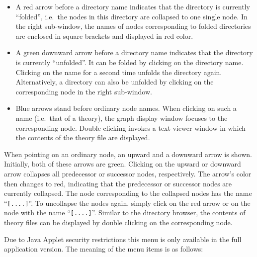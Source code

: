 \begin{isabellebody}
\begin{isamarkuptext}
  \begin{itemize}
  
  \item A red arrow before a directory name indicates that the
  directory is currently ``folded'', i.e.~the nodes in this directory
  are collapsed to one single node. In the right sub-window, the names
  of nodes corresponding to folded directories are enclosed in square
  brackets and displayed in red color.
  
  \item A green downward arrow before a directory name indicates that
  the directory is currently ``unfolded''. It can be folded by
  clicking on the directory name.  Clicking on the name for a second
  time unfolds the directory again.  Alternatively, a directory can
  also be unfolded by clicking on the corresponding node in the right
  sub-window.
  
  \item Blue arrows stand before ordinary node names. When clicking on
  such a name (i.e.\ that of a theory), the graph display window
  focuses to the corresponding node. Double clicking invokes a text
  viewer window in which the contents of the theory file are
  displayed.

  \end{itemize}%
\end{isamarkuptext}%
\isamarkuptrue%
%
\isamarkuptrue%
%
\begin{isamarkuptext}%
When pointing on an ordinary node, an upward and a downward arrow is
  shown.  Initially, both of these arrows are green. Clicking on the
  upward or downward arrow collapses all predecessor or successor
  nodes, respectively. The arrow's color then changes to red,
  indicating that the predecessor or successor nodes are currently
  collapsed. The node corresponding to the collapsed nodes has the
  name ``\verb|[....]|''. To uncollapse the nodes again, simply
  click on the red arrow or on the node with the name ``\verb|[....]|''. Similar to the directory browser, the contents of
  theory files can be displayed by double clicking on the
  corresponding node.%
\end{isamarkuptext}%
\isamarkuptrue%
%
\isamarkuptrue%
%
\begin{isamarkuptext}%
Due to Java Applet security restrictions this menu is only available
  in the full application version. The meaning of the menu items is as
  follows:


\end{isamarkuptext}
\end{isabellebody}
